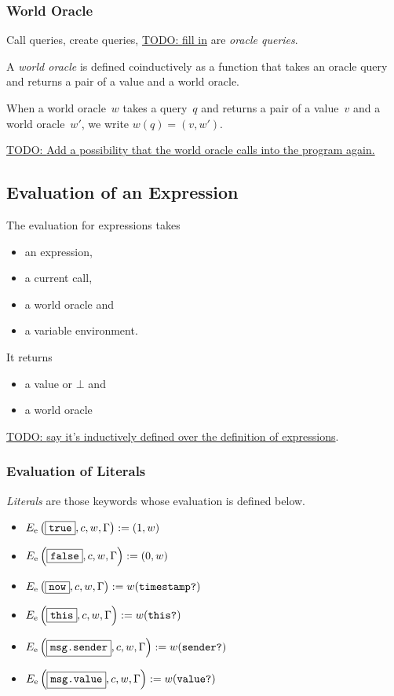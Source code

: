 \documentclass{book}
\newcommand{\todo}[1]{\underline{TODO: {#1}}}
\newcommand{\evalE}[1]{E_\mathrm{e}\left({#1}\right)}
\begin{document}
\subsubsection{World Oracle}

Call queries, create queries, \todo{fill in} are \textit{oracle queries}.

A \textit{world oracle} is defined coinductively as a function that takes an oracle query and returns a pair of a value and a world oracle.

When a world oracle~$w$ takes a query~$q$ and returns a pair of a value~$v$ and a world oracle~$w'$, we write $w(q) = (v, w')$.

\todo{Add a possibility that the world oracle calls into the program again.}

\subsection{Evaluation of an Expression}

The evaluation for expressions takes
\begin{itemize}
\item an expression,
\item a current call,
\item a world oracle and
\item a variable environment.
\end{itemize}
It returns
\begin{itemize}
\item a value or $\bot$ and
\item a world oracle
\end{itemize}



\todo{say it's inductively defined over the definition of expressions}.

\subsubsection{Evaluation of Literals}

\textit{Literals} are those keywords whose evaluation is defined below.

\begin{itemize}
  \item $\evalE{\boxed{\true}, c, w, \Gamma} := (1, w)$
  \item $\evalE{\boxed{\false}, c, w, \Gamma} := (0, w)$
  \item $\evalE{\boxed{\now}, c, w, \Gamma} := w(\timestampQuery)$
  \item $\evalE{\boxed{\this}, c, w, \Gamma} := w(\thisQuery)$
  \item $\evalE{\boxed{\msgsender}, c, w, \Gamma} := w(\senderQuery)$
  \item $\evalE{\boxed{\msgvalue}, c, w, \Gamma} := w(\valueQuery)$
\end{itemize}
\end{document}
